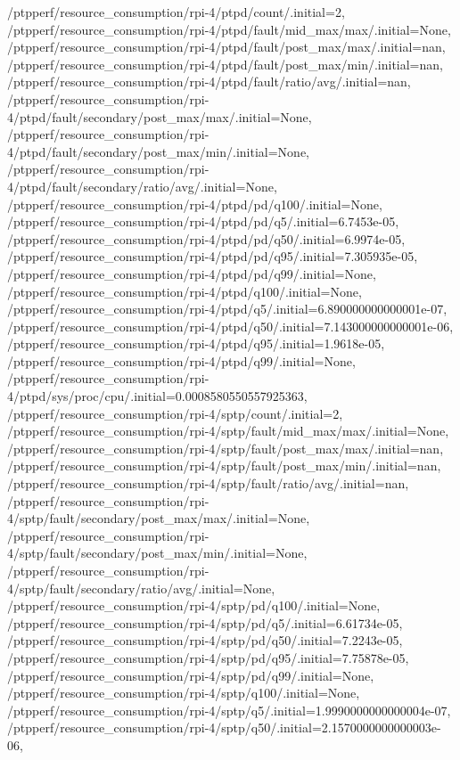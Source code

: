 {    /ptpperf/resource_consumption/rpi-4/ptpd/count/.initial=2,
    /ptpperf/resource_consumption/rpi-4/ptpd/fault/mid_max/max/.initial=None,
    /ptpperf/resource_consumption/rpi-4/ptpd/fault/post_max/max/.initial=nan,
    /ptpperf/resource_consumption/rpi-4/ptpd/fault/post_max/min/.initial=nan,
    /ptpperf/resource_consumption/rpi-4/ptpd/fault/ratio/avg/.initial=nan,
    /ptpperf/resource_consumption/rpi-4/ptpd/fault/secondary/post_max/max/.initial=None,
    /ptpperf/resource_consumption/rpi-4/ptpd/fault/secondary/post_max/min/.initial=None,
    /ptpperf/resource_consumption/rpi-4/ptpd/fault/secondary/ratio/avg/.initial=None,
    /ptpperf/resource_consumption/rpi-4/ptpd/pd/q100/.initial=None,
    /ptpperf/resource_consumption/rpi-4/ptpd/pd/q5/.initial=6.7453e-05,
    /ptpperf/resource_consumption/rpi-4/ptpd/pd/q50/.initial=6.9974e-05,
    /ptpperf/resource_consumption/rpi-4/ptpd/pd/q95/.initial=7.305935e-05,
    /ptpperf/resource_consumption/rpi-4/ptpd/pd/q99/.initial=None,
    /ptpperf/resource_consumption/rpi-4/ptpd/q100/.initial=None,
    /ptpperf/resource_consumption/rpi-4/ptpd/q5/.initial=6.890000000000001e-07,
    /ptpperf/resource_consumption/rpi-4/ptpd/q50/.initial=7.143000000000001e-06,
    /ptpperf/resource_consumption/rpi-4/ptpd/q95/.initial=1.9618e-05,
    /ptpperf/resource_consumption/rpi-4/ptpd/q99/.initial=None,
    /ptpperf/resource_consumption/rpi-4/ptpd/sys/proc/cpu/.initial=0.0008580550557925363,
    /ptpperf/resource_consumption/rpi-4/sptp/count/.initial=2,
    /ptpperf/resource_consumption/rpi-4/sptp/fault/mid_max/max/.initial=None,
    /ptpperf/resource_consumption/rpi-4/sptp/fault/post_max/max/.initial=nan,
    /ptpperf/resource_consumption/rpi-4/sptp/fault/post_max/min/.initial=nan,
    /ptpperf/resource_consumption/rpi-4/sptp/fault/ratio/avg/.initial=nan,
    /ptpperf/resource_consumption/rpi-4/sptp/fault/secondary/post_max/max/.initial=None,
    /ptpperf/resource_consumption/rpi-4/sptp/fault/secondary/post_max/min/.initial=None,
    /ptpperf/resource_consumption/rpi-4/sptp/fault/secondary/ratio/avg/.initial=None,
    /ptpperf/resource_consumption/rpi-4/sptp/pd/q100/.initial=None,
    /ptpperf/resource_consumption/rpi-4/sptp/pd/q5/.initial=6.61734e-05,
    /ptpperf/resource_consumption/rpi-4/sptp/pd/q50/.initial=7.2243e-05,
    /ptpperf/resource_consumption/rpi-4/sptp/pd/q95/.initial=7.75878e-05,
    /ptpperf/resource_consumption/rpi-4/sptp/pd/q99/.initial=None,
    /ptpperf/resource_consumption/rpi-4/sptp/q100/.initial=None,
    /ptpperf/resource_consumption/rpi-4/sptp/q5/.initial=1.9990000000000004e-07,
    /ptpperf/resource_consumption/rpi-4/sptp/q50/.initial=2.1570000000000003e-06,
}
